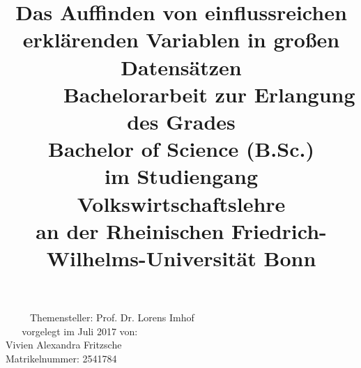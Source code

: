 \documentclass[Research_Module_ES.tex]{subfiles}
\begin{document}
\title{\LARGE{\textbf{Das Auffinden von einflussreichen erklärenden Variablen in großen Datensätzen}}\\
	~
	\newline\newline\newline
	~										
	\newline\newline\newline
	~
	\doublespacing
	\normalsize	
	Bachelorarbeit zur Erlangung des Grades\\
	Bachelor of Science (B.Sc.)\\
	im Studiengang Volkswirtschaftslehre\\
	an der Rheinischen Friedrich-Wilhelms-Universität Bonn}

\onehalfspacing			
\author{}
\date{}
\maketitle	
\begin{center}
	\normalsize 
	~										
	\newline\newline\newline
	~										
	\newline\newline\newline
	~
	Themensteller: Prof. Dr. Lorens Imhof\\
	~
	\newline\newline\newline
	~	
	vorgelegt im Juli 2017 von:\\ 
	Vivien Alexandra Fritzsche\\		
	Matrikelnummer: 2541784
\end{center}	
	
\end{document}
